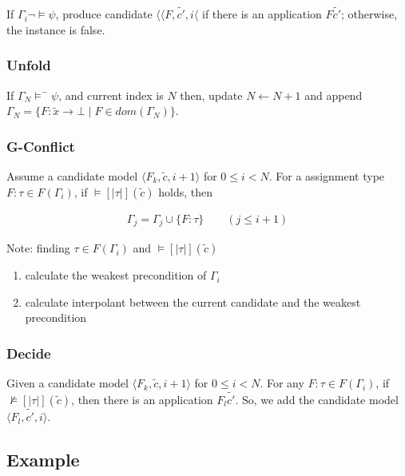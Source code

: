 \documentclass[runningheads]{llncs}
\newcommand {\semt}[1]{[\!|#1|\!]}
\begin{document}
If \(\Gamma_i \lnot \models \psi\),
produce candidate \(\langle \langle F, \tilde{c'}, i\langle\)
if there is an application \(F \tilde{c'}\); otherwise,
the instance is false.

\subsubsection{Unfold}

If \(\Gamma_N \models^{-} \psi\),
and current index is \(N\) then,
update \(N \leftarrow N + 1\) and
append \(\Gamma_N = \{F: \tilde{x} \rightarrow \bot \mid F \in
dom(\Gamma_N)\}\).

\subsubsection{G-Conflict}

Assume a candidate model \(\langle F_k, \tilde{c}, i + 1 \rangle\) for \(0 \leq i <
N\). For a assignment type \(F: \tau \in F(\Gamma_i)\),
if \(\models \semt{\tau}(\tilde{c})\) holds, then

\begin{align*}
    \Gamma_j = \Gamma_j \cup \{F: \tau\} \quad \quad (j \leq i + 1)
\end{align*}

Note: finding \(\tau \in F(\Gamma_i)\) and \(\models \semt{\tau}(\tilde{c})\)

\begin{enumerate}
    \item calculate the weakest precondition of \(\Gamma_i\)
    \item calculate interpolant between the current candidate and the weakest
        precondition
\end{enumerate}

\subsubsection{Decide}

Given a candidate model \(\langle F_k, \tilde{c}, i + 1 \rangle\) for \(0 \leq i <
N\).
For any \(F: \tau \in F(\Gamma_i)\),
if \(\not \models \semt{\tau}(\tilde{c})\), then there is an application \(F_l
\tilde{c'}\). So, we add the candidate model \(\langle F_l, \tilde{c'},
i\rangle\).

\subsection{Example}
\end{document}
